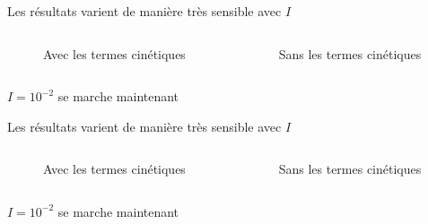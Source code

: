 \documentclass[10pt]{beamer}
\begin{document}
\begin{frame}{Les résultats varient de manière très sensible avec $I$}
    \begin{columns}
        \begin{column}{0.5\textwidth}
            \begin{figure}[h]
                \centering
                \scalebox{0.5}{}
                \caption{Avec les termes cinétiques}
            \end{figure}
        \end{column}
        \begin{column}{0.5\textwidth}
            \begin{figure}[h]
                \centering
                \scalebox{0.5}{}
                \caption{Sans les termes cinétiques}
            \end{figure}
        \end{column}
    \end{columns}
    $I = 10^{-2}$ se marche maintenant
\end{frame}

\begin{frame}{Les résultats varient de manière très sensible avec $I$}
    \begin{columns}
        \begin{column}{0.5\textwidth}
            \begin{figure}[h]
                \centering
                \scalebox{0.5}{}
                \caption{Avec les termes cinétiques}
            \end{figure}
        \end{column}
        \begin{column}{0.5\textwidth}
            \begin{figure}[h]
                \centering
                \scalebox{0.5}{}
                \caption{Sans les termes cinétiques}
            \end{figure}
        \end{column}
    \end{columns}
    $I = 10^{-2}$ se marche maintenant
\end{frame}
\end{document}
